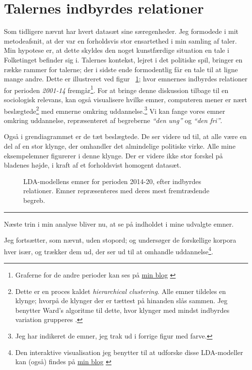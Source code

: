 \section{Talernes indbyrdes relationer}
Som tidligere nævnt har hvert datasæt sine særegenheder.
Jeg formodede i mit metodeafsnit, at der var en forholdsvis stor ensartethed i min samling af taler.
Min hypotese er, at dette skyldes den noget kunstfærdige situation en tale i Folketinget befinder sig i.
Talernes kontekst, lejret i det politiske spil, bringer en række rammer for talerne; der i sidste ende formodentlig får en tale til at ligne mange andre.
Dette er illustreret ved figur ~\ref{fig:dendro_all};
hvor emnernes indbyrdes relationer for perioden \textit{2001-14} fremgår\footnote{
Graferne for de andre perioder kan ses på \href{martinandreasandersen.com/projects/au/}{min blog} \autocite{andersenSelectedAssignmentsAarhus}}.
For at bringe denne diskussion tilbage til en sociologisk relevans, kan også visualisere hvilke emner, computeren mener er nært beslægtede\footnote{Dette er en proces kaldet \textit{hierarchical clustering}. Alle emner tildeles en klynge; hvorpå de klynger der er tættest på hinanden slås sammen. Jeg benytter Ward's algoritme til dette, hvor klynger med mindst indbyrdes variation grupperes \autocite{wardHierarchicalGroupingOptimize1963}.} med emnerne omkring uddannelse.\footnote{Jeg har indikeret de emner, jeg trak ud i forrige figur med farve.}
Vi kan fange vores emner omkring uddannelse, repræsenteret af begreberne \textit{“den ung”} og \textit{“den fri”}.

Også i grendiagrammet er de tæt beslægtede.
De ser videre ud til, at alle være en del af en stor klynge, der omhandler det almindelige politiske virke.
Alle mine eksempelemner figurerer i denne klynge.
Der er videre ikke stor forskel på bladenes højde, i kraft af et forholdsvist homogent datasæt. 

\begin{figure}
  
  \caption{LDA-modellens emner for perioden 2014-20, efter indbyrdes relationer. Emner repræsenteres med deres mest fremtrædende begreb.}
\label{fig:dendro_all}
\end{figure}

\hrule

Næste trin i min analyse bliver nu, at se på indholdet i mine udvalgte emner.

Jeg fortsætter, som nævnt, uden stopord; og undersøger de forskellige korpora hver især, og trækker dem ud, der ser ud til at omhandle uddannelse\footnote{Den interaktive visualisation jeg benytter til at udforske disse LDA-modeller kan (også) findes på \href{martinandreasandersen.com/projects/au/}{min blog} \autocite{andersenSelectedAssignmentsAarhus}}.

